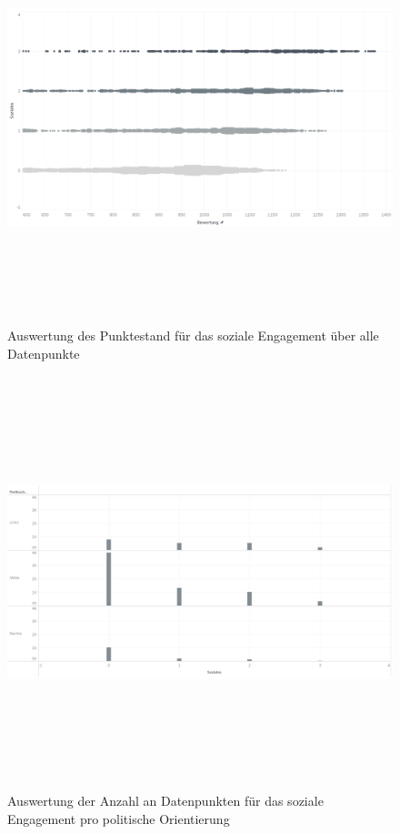 \documentclass[a4paper,12pt]{report}
\begin{document}
\begin{figure}[!h]
    \centering
    \includegraphics[width=16cm,height=12cm]{Diagramme/SZ2_Tab10.PNG}
    \caption{Auswertung des Punktestand für das soziale Engagement über alle Datenpunkte}
    \label{fig:SZ2Tab10}
\end{figure}

\begin{figure}[!h]
    \centering
    \includegraphics[width=16cm,height=12cm]{Diagramme/SZ2_Tab11.PNG}
    \caption{Auswertung der Anzahl an Datenpunkten für das soziale Engagement pro politische Orientierung}
    \label{fig:SZ2Tab11}
\end{figure}
\end{document}
